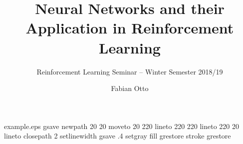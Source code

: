 %
%
%
%
%
\begin{filecontents*}{example.eps}
    gsave
    newpath
    20 20 moveto
    20 220 lineto
    220 220 lineto
    220 20 lineto
    closepath
    2 setlinewidth
    gsave
    .4 setgray fill
    grestore
    stroke
    grestore
\end{filecontents*}
%
\RequirePackage{fix-cm}
%
\documentclass[smallextended]{svjour3}       %
%
\smartqed  %
%
\usepackage{graphicx}
%
%
%
%
%


    \title{Neural Networks and their Application in Reinforcement Learning%
    }
    \subtitle{Reinforcement Learning Seminar -- Winter Semester 2018/19}


    \author{Fabian Otto
    }


